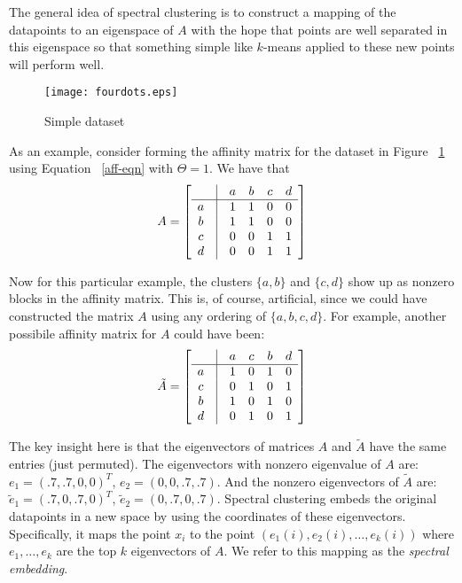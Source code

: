 \documentclass[11pt]{article}
\begin{document}
\begin{enumerate}
The general idea of spectral clustering is to construct
a mapping of the datapoints to an eigenspace of $A$ with the 
hope that points are well separated in this eigenspace so that something
simple like $k$-means applied to these new points will perform well.
\begin{figure}[ht!]
  \begin{center}
    \texttt{[image: fourdots.eps]}\\
\end{center}
\caption{\label{fourdots-fig} Simple dataset}
\end{figure}

As an example, consider forming the affinity matrix for 
the dataset in Figure ~\ref{fourdots-fig} using Equation ~\ref{aff-eqn} with
$\Theta=1$.  We have that
\[
A = \left[\begin{array}{cccccc}
 & \vline & a & b & c & d \\
 \hline
a & \vline & 1 & 1 & 0 & 0 \\
b & \vline & 1 & 1 & 0 & 0\\
c & \vline & 0 & 0 & 1 & 1\\
d & \vline & 0 & 0 & 1 & 1\\
\end{array}\right]
\]

Now for this particular example, the clusters $\{a,b\}$ and $\{c,d\}$
show up as nonzero blocks in the affinity matrix.  This is, of course,
artificial, since we could have constructed the matrix $A$ using any
ordering of $\{a,b,c,d\}$.  For example, another possibile affinity matrix
for $A$ could have been:
\[
\tilde{A} = \left[\begin{array}{cccccc}
 & \vline & a & c & b & d \\
 \hline
a & \vline & 1 & 0 & 1 & 0 \\
c & \vline & 0 & 1 & 0 & 1\\
b & \vline & 1 & 0 & 1 & 0\\
d & \vline & 0 & 1 & 0 & 1\\
\end{array}\right]
\]

The key insight here is that the eigenvectors of 
matrices $A$ and $\tilde{A}$ have the same entries (just 
permuted).  The eigenvectors with nonzero eigenvalue of $A$
are: $e_1=(.7,.7,0,0)^T$, $e_2=(0,0,.7,.7)$.  And the nonzero 
eigenvectors of $\tilde{A}$ are: $\tilde{e}_1=(.7,0,.7,0)^T$, $\tilde{e}_2=(0,.7,0,.7)$.
Spectral clustering embeds the original datapoints in a new space
by using the coordinates of these eigenvectors.  Specifically, it maps the 
point $x_i$ to the point $(e_1(i),e_2(i),\dots,e_k(i))$ where $e_1,\dots,e_k$ 
are the top $k$ eigenvectors of $A$.  We refer to this mapping as the \emph{spectral embedding}.  


\end{enumerate}
\end{document}
